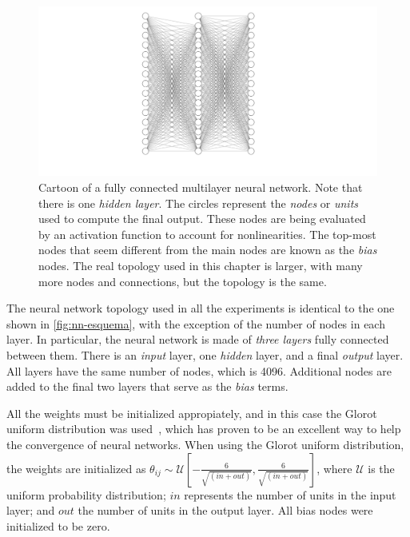 \begin{figure}[t]
    \includegraphics[width=\textwidth]{figuras/capitulo-3/neural-network.pdf}
    \vspace{-1.5cm}
    \caption[General schematics of a neural network.]{Cartoon of a fully connected multilayer neural network. Note that there is one \emph{hidden layer}. The circles represent the \emph{nodes} or \emph{units} used to compute the final output. These nodes are being evaluated by an activation function to account for nonlinearities. The top-most nodes that seem different from the main nodes are known as the \emph{bias} nodes. The real topology used in this chapter is larger, with many more nodes and connections, but the topology is the same.}
    \label{fig:nn-esquema}
\end{figure}

The neural network topology used in all the experiments is identical to the one
shown in \autoref{fig:nn-esquema}, with the exception of the number of nodes in each layer.
In particular, the neural network is made of \emph{three layers} fully connected between 
them.
There is an \emph{input} layer, one \emph{hidden} layer, and a final \emph{output} layer.
All layers have the same number of nodes, which is 4096. Additional nodes are added to the
final two layers that serve as the \emph{bias} terms.

All the weights must be initialized appropiately, and in this case the Glorot uniform
distribution was used~\cite{glorotUnderstandingDifficultyTraining2010}, which has proven
to be an excellent way to help the convergence of neural networks.
When using the Glorot uniform distribution, the weights are initialized as
$
\theta_{ij} \sim \mathcal{U} \left[ -\frac{6}{\sqrt{(in + out)}},
\frac{6}{\sqrt{(in + out)}} \right]
$,
where $\mathcal{U}$ is the uniform probability distribution;
$in$ represents the number of units in the input layer; and $out$ the number of
units in the output layer. All bias nodes were initialized to be zero.

